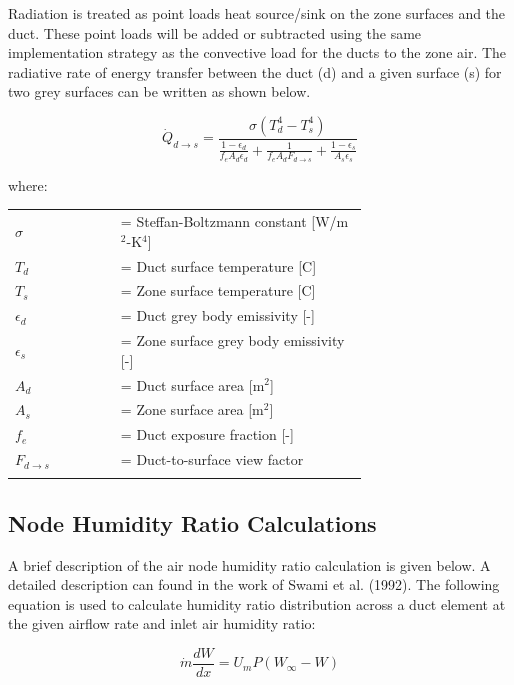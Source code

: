 Radiation is treated as point loads heat source/sink on the zone surfaces and the duct.  These point loads will be added or subtracted using the same implementation strategy as the convective load for the ducts to the zone air.  The radiative rate of energy transfer between the duct (d) and a given surface (s) for two grey surfaces can be written as shown below.


\begin{equation}
\dot{Q}_{d\rightarrow s} = \frac{\sigma (T^4_d - T^4_s)}{\frac{1 - \epsilon_d}{f_e A_d \epsilon_d} + \frac{1}{f_e A_d F_{d\rightarrow s}}+\frac{1 - \epsilon_s}{A_s \epsilon_s}}
\end{equation}

where:

\begin{tabular}{lp{0.7\linewidth}}
\\
$\sigma$ &= Steffan-Boltzmann constant [W/m\(^{2}\)-K\(^{4}\)] \\
$T_d$ &= Duct surface temperature [C] \\
$T_s$ &= Zone surface temperature [C] \\ 
$\epsilon_d$ &= Duct grey body emissivity [-] \\
$\epsilon_s$ &= Zone surface grey body emissivity [-] \\
$A_d$ &= Duct surface area [m\(^{2}\)] \\
$A_s$ &= Zone surface area [m\(^{2}\)] \\
$f_e$ &= Duct exposure fraction [-] \\
$F_{d\rightarrow s}$ &= Duct-to-surface view factor \\
\\
\end{tabular}

\subsection{Node Humidity Ratio Calculations}\label{node-humidity-ratio-calculations}

A brief description of the air node humidity ratio calculation is given below. A detailed description can found in the work of Swami et al. (1992). The following equation is used to calculate humidity ratio distribution across a duct element at the given airflow rate and inlet air humidity ratio:

\begin{equation}
\dot{m} \frac{dW}{dx} = U_m P(W_\infty - W)
\end{equation}

